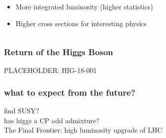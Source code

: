 \documentclass[xcolor={usenames,dvipsnames,svgnames,table}]{beamer}
\begin{document}
\begin{frame}
\begin{columns}
\begin{column}{0.49\textwidth}
\begin{figure}[t]
		\end{figure}
		\begin{itemize}
			\item More integrated luminosity (higher statistics)
			\item Higher cross sections for interesting physics
		\end{itemize}
	\end{column}
	\end{columns}
\end{frame}

\begin{frame}
	\frametitle{Return of the Higgs Boson}
	PLACEHOLDER: HIG-18-001
\end{frame}

\begin{frame}
	\frametitle{what to expect from the future?}
	find SUSY? \\
	has higgs a CP odd admixture?\\
	The Final Frontier: high luminosity upgrade of LHC
\end{frame}
\end{document}
